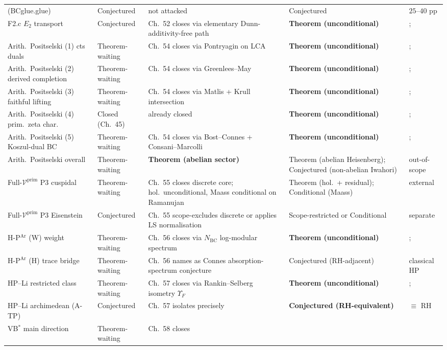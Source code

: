 \begin{center}
\begin{tabular}{p{}|p{}|p{}|p{}|p{}}
(BCglue.glue) & Conjectured & not attacked &
Conjectured & \(25\)--\(40\) pp \\
F2.c \(E_{2}\) transport & Conjectured & Ch.~52 closes via
elementary Dunn-additivity-free path & \textbf{Theorem
(unconditional)} &; \\
Arith.~Positselski (1) cts duals & Theorem-waiting & Ch.~54 closes
via Pontryagin on LCA & \textbf{Theorem (unconditional)} &; \\
Arith.~Positselski (2) derived completion & Theorem-waiting &
Ch.~54 closes via Greenlees--May & \textbf{Theorem (unconditional)} &; \\
Arith.~Positselski (3) faithful lifting & Theorem-waiting & Ch.~54
closes via Matlis + Krull intersection &
\textbf{Theorem (unconditional)} &; \\
Arith.~Positselski (4) prim.~zeta char.~& Closed (Ch.~45) &
already closed & \textbf{Theorem (unconditional)} &; \\
Arith.~Positselski (5) Koszul-dual BC & Theorem-waiting & Ch.~54
closes via Bost--Connes + Consani--Marcolli &
\textbf{Theorem (unconditional)} &; \\
Arith.~Positselski overall & Theorem-waiting &
\textbf{Theorem (abelian sector)} & Theorem (abelian Heisenberg);
Conjectured (non-abelian Iwahori) & out-of-scope \\
Full-\(\mathcal{V}^{\mathrm{prim}}\) P3 cuspidal & Theorem-waiting
& Ch.~55 closes discrete core; hol.~unconditional, Maass
conditional on Ramanujan & Theorem (hol.~+ residual);
Conditional (Maass) & external \\
Full-\(\mathcal{V}^{\mathrm{prim}}\) P3 Eisenstein & Conjectured &
Ch.~55 scope-excludes discrete or applies LS normalisation &
Scope-restricted or Conditional & separate \\
H-P\(^{\mathrm{Ar}}\) (W) weight & Theorem-waiting & Ch.~56
closes via \(N_{\mathrm{BC}}\) log-modular spectrum &
\textbf{Theorem (unconditional)} &; \\
H-P\(^{\mathrm{Ar}}\) (H) trace bridge & Theorem-waiting & Ch.~56
names as Connes absorption-spectrum conjecture & Conjectured
(RH-adjacent) & classical HP \\
HP--Li restricted class & Theorem-waiting & Ch.~57 closes via
Rankin--Selberg isometry \(\Upsilon_{F}\) &
\textbf{Theorem (unconditional)} &; \\
HP--Li archimedean (A-TP) & Conjectured & Ch.~57 isolates
precisely & \textbf{Conjectured (RH-equivalent)} & \(\equiv\) RH \\
VB\(^{*}\) main direction & Theorem-waiting & Ch.~58 closes

\end{tabular}
\end{center}
